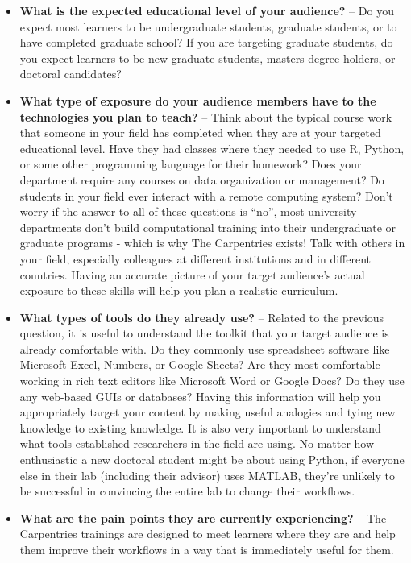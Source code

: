 \documentclass[]{book}
\begin{document}
\begin{itemize}
\item
  \textbf{What is the expected educational level of your audience?} -- Do you expect most learners to be undergraduate students, graduate students, or to have completed graduate school?
  If you are targeting graduate students,
  do you expect learners to be new graduate students,
  masters degree holders, or doctoral candidates?
\item
  \textbf{What type of exposure do your audience members have to the technologies you
  plan to teach?} -- Think about the typical course work that someone in your field
  has completed when they are at your targeted educational level. Have they had
  classes where they needed to use R, Python, or some other programming language
  for their homework? Does your department require any courses on data
  organization or management? Do students in your field ever interact with a
  remote computing system? Don't worry if the answer to all of these questions is
  ``no'', most university departments don't build computational training into their
  undergraduate or graduate programs - which is why The Carpentries exists! Talk
  with others in your field, especially colleagues at different institutions and
  in different countries. Having an accurate picture of your target audience's
  actual exposure to these skills will help you plan a realistic curriculum.
\item
  \textbf{What types of tools do they already use?} -- Related to the previous question, it is useful to understand
  the toolkit that your target audience is already comfortable with. Do they commonly use spreadsheet software
  like Microsoft Excel, Numbers, or Google Sheets? Are they most comfortable working in rich text editors like
  Microsoft Word or Google Docs? Do they use any web-based GUIs or databases? Having this information will help you
  appropriately target your content by making useful analogies and tying new knowledge to existing knowledge. It
  is also very important to understand what tools established researchers in the field are using. No matter how
  enthusiastic a new doctoral student might be about using Python, if everyone else in their lab (including
  their advisor) uses MATLAB, they're unlikely to be successful in convincing the entire lab to change their
  workflows.
\item
  \textbf{What are the pain points they are currently experiencing?} -- The Carpentries trainings are designed to
  meet learners where they are and help them improve their workflows in a way that is immediately useful for them.

\end{itemize}
\end{document}

